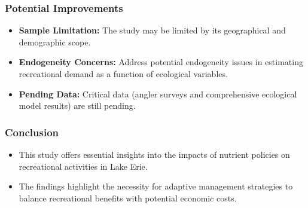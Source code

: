 \documentclass[professionalfonts, aspectratio=169]{beamer}
\begin{document}
\begin{frame}
  \frametitle{Potential Improvements}
  \begin{itemize}
    \item \textbf{Sample Limitation:} The study may be limited by its geographical and demographic scope.
    \item \textbf{Endogeneity Concerns:} Address potential endogeneity issues in estimating recreational demand as a function of ecological variables.
    \item \textbf{Pending Data:} Critical data (angler surveys and comprehensive ecological model results) are still pending.
  \end{itemize}
\end{frame}

\begin{frame}
  \frametitle{Conclusion}
  \begin{itemize}
    \item This study offers essential insights into the impacts of nutrient policies on recreational activities in Lake Erie.
    \item The findings highlight the necessity for adaptive management strategies to balance recreational benefits with potential economic costs.
  \end{itemize}
\end{frame}
\end{document}
